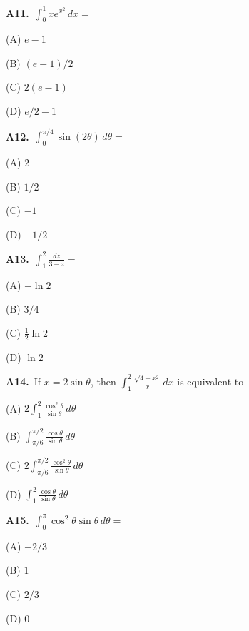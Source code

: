 \documentclass[11pt]{article}
\begin{document}
\bigskip\noindent\textbf{A11.}\ $\int_0^1xe^{x^2}\,dx=$
\begin{list}{}{\setlength{\leftmargin}{3em}\setlength{\labelwidth}{2.5em}\setlength{\itemsep}{0pt}\setlength{\topsep}{2pt}}
\item[(A)] $e-1$
\item[(B)] $(e-1)/2$
\item[(C)] $2(e-1)$
\item[(D)] $e/2-1$
\end{list}

\bigskip\noindent\textbf{A12.}\ $\int_0^{\pi/4}\sin(2\theta)\,d\theta=$
\begin{list}{}{\setlength{\leftmargin}{3em}\setlength{\labelwidth}{2.5em}\setlength{\itemsep}{0pt}\setlength{\topsep}{2pt}}
\item[(A)] $2$
\item[(B)] $1/2$
\item[(C)] $-1$
\item[(D)] $-1/2$
\end{list}

\bigskip\noindent\textbf{A13.}\ $\int_1^2\frac{dz}{3-z}=$
\begin{list}{}{\setlength{\leftmargin}{3em}\setlength{\labelwidth}{2.5em}\setlength{\itemsep}{0pt}\setlength{\topsep}{2pt}}
\item[(A)] $-\ln2$
\item[(B)] $3/4$
\item[(C)] $\frac12\ln2$
\item[(D)] $\ln2$
\end{list}

\bigskip\noindent\textbf{A14.}\ If $x=2\sin\theta$, then $\int_1^2\frac{\sqrt{4-x^2}}x\,dx$ is equivalent to
\begin{list}{}{\setlength{\leftmargin}{3em}\setlength{\labelwidth}{2.5em}\setlength{\itemsep}{0pt}\setlength{\topsep}{2pt}}
\item[(A)] $2\int_1^2\frac{\cos^2\theta}{\sin\theta}\,d\theta$
\item[(B)] $\int_{\pi/6}^{\pi/2}\frac{\cos\theta}{\sin\theta}\,d\theta$
\item[(C)] $2\int_{\pi/6}^{\pi/2}\frac{\cos^2\theta}{\sin\theta}\,d\theta$
\item[(D)] $\int_1^2\frac{\cos\theta}{\sin\theta}\,d\theta$
\end{list}

\bigskip\noindent\textbf{A15.}\ $\int_0^\pi\cos^2\theta\sin\theta\,d\theta=$
\begin{list}{}{\setlength{\leftmargin}{3em}\setlength{\labelwidth}{2.5em}\setlength{\itemsep}{0pt}\setlength{\topsep}{2pt}}
\item[(A)] $-2/3$
\item[(B)] $1$
\item[(C)] $2/3$
\item[(D)] $0$
\end{list}
\end{document}
